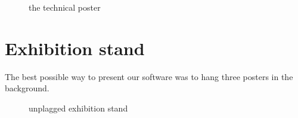 \begin{figure}[!hbtp]
  \centering
  \caption{the technical poster}
  \label{fig:poster_technical}
\end{figure}

\pagebreak 


\section{Exhibition stand}

The best possible way to present our software was to hang three posters in the background. 



\begin{figure}[!hbtp]
  \centering
  \caption{unplagged exhibition stand}
  \label{fig:unplagged_exhibition_stand1}
\end{figure}

